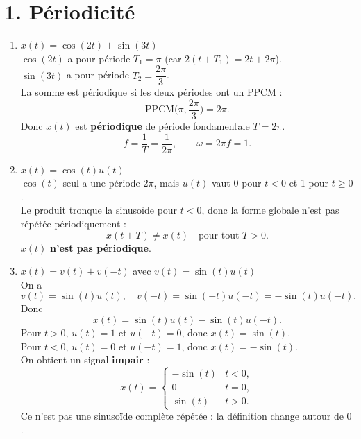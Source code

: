 
\section*{1. Périodicité}

\begin{solution}
    \text{ }
    \begin{enumerate}[label=(\alph*)]
        \item $x(t) = \cos(2t)+\sin(3t)$ \\

        $\cos(2t)$ a pour période $T_1 = \pi$ (car $2(t+T_1) = 2t + 2\pi$).  \\
        $\sin(3t)$ a pour période $T_2 = \dfrac{2\pi}{3}$. \\ 
    
        La somme est périodique si les deux périodes ont un PPCM :
        \[
          \text{PPCM}\Big(\pi, \frac{2\pi}{3}\Big) = 2\pi.
        \]
        Donc $x(t)$ est \textbf{périodique} de période fondamentale $T = 2\pi$.  
        \[
          f = \frac{1}{T} = \frac{1}{2\pi}, \qquad
          \omega = 2\pi f = 1.
        \]
        
        \item $x(t) = \cos(t)u(t)$ \\

        $\cos(t)$ seul a une période $2\pi$, mais $u(t)$ vaut 0 pour $t<0$ et 1 pour $t\ge 0$. \\
        Le produit tronque la sinusoïde pour $t<0$, donc la forme globale n’est pas répétée périodiquement :
        \[
          x(t+T) \neq x(t) \quad \text{pour tout } T>0.
        \]
        $x(t)$ \textbf{n’est pas périodique}.
        
        \item $x(t) = v(t)+v(-t)$ avec $v(t) = \sin(t)u(t)$ \\

        On a
        \[
          v(t) = \sin(t)u(t), \quad v(-t) = \sin(-t)u(-t) = -\sin(t)u(-t).
        \]
        Donc
        \[
          x(t) = \sin(t)u(t) - \sin(t)u(-t).
        \]
        Pour $t>0$, $u(t)=1$ et $u(-t)=0$, donc $x(t) = \sin(t)$.  \\
        Pour $t<0$, $u(t)=0$ et $u(-t)=1$, donc $x(t) = -\sin(t)$. \\
    
        On obtient un signal \textbf{impair} :
        \[
          x(t) =
          \begin{cases}
            -\sin(t) & t<0, \\
            0        & t=0, \\
            \sin(t)  & t>0.
          \end{cases}
        \]
        Ce n’est pas une sinusoïde complète répétée : la définition change autour de $0$.  \\
    

\end{enumerate}
\end{solution}

